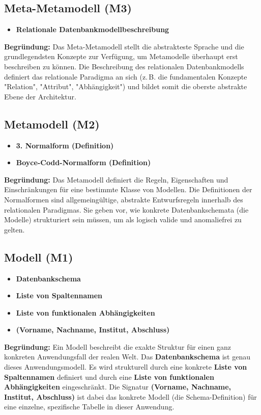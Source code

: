 \documentclass[12pt]{scrartcl}
\begin{document}

\subsection*{Meta-Metamodell (M3)}
\begin{itemize}
    \item \textbf{Relationale Datenbankmodellbeschreibung}
\end{itemize}
\textbf{Begründung:} Das Meta-Metamodell stellt die abstrakteste Sprache und die grundlegendsten Konzepte zur Verfügung, um Metamodelle überhaupt erst beschreiben zu können. Die Beschreibung des relationalen Datenbankmodells definiert das relationale Paradigma an sich (z.\,B. die fundamentalen Konzepte "Relation", "Attribut", "Abhängigkeit") und bildet somit die oberste abstrakte Ebene der Architektur.

\subsection*{Metamodell (M2)}
\begin{itemize}
    \item \textbf{3. Normalform (Definition)}
    \item \textbf{Boyce-Codd-Normalform (Definition)}
\end{itemize}
\textbf{Begründung:} Das Metamodell definiert die Regeln, Eigenschaften und Einschränkungen für eine bestimmte Klasse von Modellen. Die Definitionen der Normalformen sind allgemeingültige, abstrakte Entwurfsregeln innerhalb des relationalen Paradigmas. Sie geben vor, wie konkrete Datenbankschemata (die Modelle) strukturiert sein müssen, um als logisch valide und anomaliefrei zu gelten.

\subsection*{Modell (M1)}
\begin{itemize}
    \item \textbf{Datenbankschema}
    \item \textbf{Liste von Spaltennamen}
    \item \textbf{Liste von funktionalen Abhängigkeiten}
    \item \textbf{(Vorname, Nachname, Institut, Abschluss)}
\end{itemize}
\textbf{Begründung:} Ein Modell beschreibt die exakte Struktur für einen ganz konkreten Anwendungsfall der realen Welt. Das \textbf{Datenbankschema} ist genau dieses Anwendungsmodell. Es wird strukturell durch eine konkrete \textbf{Liste von Spaltennamen} definiert und durch eine \textbf{Liste von funktionalen Abhängigkeiten} eingeschränkt. Die Signatur \textbf{(Vorname, Nachname, Institut, Abschluss)} ist dabei das konkrete Modell (die Schema-Definition) für eine einzelne, spezifische Tabelle in dieser Anwendung.
\end{document}
